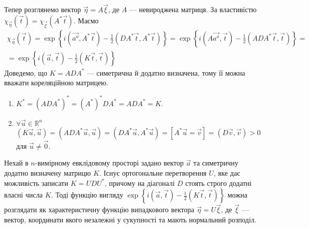 Тепер розглянемо вектор $\vec{\eta} = A\vec{\xi}$, де $A$ --- невироджена матриця. За властивістю 
$\chi_{\vec{\eta}}(\vec{t}) = \chi_{\vec{\xi}}(A^{*}\vec{t})$. Маємо
\begin{equation}
    \begin{gathered}
        \chi_{\vec{\eta}}(\vec{t}) = \exp\left\{i(\vec{a^o}, A^{*}\vec{t}) - \frac{1}{2}(DA^{*}\vec{t}, A^{*}\vec{t})\right\} =
    \exp\left\{i(A\vec{a^o}, \vec{t}) - \frac{1}{2}(ADA^{*}\vec{t}, \vec{t})\right\} = \\
    = \exp\left\{i(\vec{a}, \vec{t}) - \frac{1}{2}(K\vec{t}, \vec{t})\right\}
    \end{gathered}
\end{equation}
Доведемо, що $K = ADA^{*}$ --- симетрична й додатно визначена, тому її можна вважати кореляційною матрицею.
\begin{enumerate}
    \item $K^{*} = \left( ADA^{*}\right)^{*} = \left( A^{*}\right)^{*}DA^{*} = ADA^{*} = K$.
    \item $\forall \vec{u} \in \mathbb{R}^n$ $\left( K \vec{u}, \vec{u}\right) = \left( ADA^{*} \vec{u}, \vec{u}\right) =
    \left( DA^{*} \vec{u}, A^{*}\vec{u}\right) = \left[ A^{*}\vec{u} = \vec{v}\right] = \left( D\vec{v}, \vec{v}\right) > 0$ для $\vec{u}\neq \vec{0}$.
\end{enumerate}

Нехай в $n$-вимірному евклідовому просторі задано вектор $\vec{a}$ та симетричну додатно визначену матрицю $K$.
Існує ортогональне перетворення $U$, яке дає можливість записати $K=UDU^{*}$, причому на діагоналі $D$ стоять строго додатні
власні числа $K$. Тоді функцію вигляду $\exp\left\{i(\vec{a}, \vec{t}) - \frac{1}{2}(K\vec{t}, \vec{t})\right\}$ 
можна розглядати як характеристичну функцію випадкового вектора $\vec{\eta} = U \vec{\xi}$, де $\vec{\xi}$ ---
вектор, координати якого незалежні у сукупності та мають нормальний розподіл.

